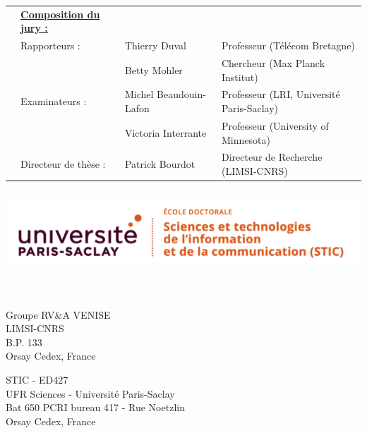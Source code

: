 \begin{titlepage}
\begin{center}
  \begin{tabular}{p{0cm} p{3.6cm} p{4.5cm} l }
    & \footnotesize\bf\underline{Composition du jury :}& &\\
    & \footnotesize{Rapporteurs} : 	& Thierry Duval	& \footnotesize{Professeur (Télécom Bretagne)} \\	
    &							&  Betty Mohler		& \footnotesize{Chercheur (Max Planck Institut)} \\
    & \footnotesize{Examinateurs} : 	& Michel Beaudouin-Lafon & \footnotesize{Professeur (LRI, Universit\'e Paris-Saclay)} \\
    &             & Victoria Interrante & \footnotesize{Professeur (University of Minnesota)} \\
    & \footnotesize{Directeur de thèse} :	& Patrick Bourdot & \footnotesize{Directeur de Recherche (LIMSI-CNRS)} \\
  \end{tabular}
\end{center}

\clearpage
\newpage

\includegraphics[height=3.0cm]{./logos/logo_stic}\hfill

\thispagestyle{empty}   

\mbox{~} %

\vfill 

\setlength{\columnsep}{7mm}
\setlength{\columnseprule}{0pt}

\begin{multicols}{2} 
\small 
\noindent Groupe RV\&A VENISE 	\\	
\noindent LIMSI-CNRS					\\
\noindent B.P. 133				\\
 Orsay Cedex, France \\	

\columnbreak

\raggedleft STIC - ED427 \\
\noindent UFR Sciences - Université Paris-Saclay \\
\noindent Bat 650 PCRI bureau 417 - Rue Noetzlin  \\
 Orsay Cedex, France
\end{multicols}

\end{titlepage}